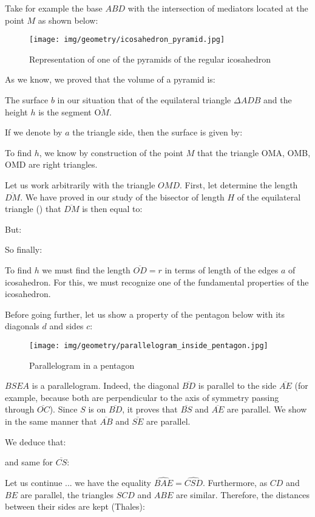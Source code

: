 {	Take for example the base $ABD$ with the intersection of mediators located at the point $M$ as shown below:
	\begin{figure}[H]
		\centering
		\texttt{[image: img/geometry/icosahedron\_pyramid.jpg]}
		\caption{Representation of one of the pyramids of the regular icosahedron}
	\end{figure}
	As we know, we proved that the volume of a pyramid is:
	
	The surface $b$ in our situation that of the equilateral triangle $\Delta ADB$ and the height $h$ is the segment $\overline{\text{O}M}$.

	If we denote by $a$ the triangle side, then the surface is given by:
	
	To find $h$, we know by construction of the point $M$ that the triangle OMA, OMB, OMD are right triangles.

	Let us work arbitrarily with the triangle $OMD$. First, let determine the length $\overline{DM}$. We have proved in our study of the bisector of length $H$ of the equilateral triangle () that $\overline{DM}$ is then equal to:
	
	But:
	
	So finally:
	
	To find $h$ we must find the length $\overline{OD}=r$ in terms of length of the edges $a$ of icosahedron. For this, we must recognize one of the fundamental properties of the icosahedron.

	Before going further, let us show a property of the pentagon below with its diagonals $d$ and sides $c$:
	\begin{figure}[H]
		\centering
		\texttt{[image: img/geometry/parallelogram\_inside\_pentagon.jpg]}
		\caption{Parallelogram in a pentagon}
	\end{figure}
	$BSEA$ is a parallelogram. Indeed, the diagonal $\overline{BD}$ is parallel to the side $\overline{AE}$ (for example, because both are perpendicular to the axis of symmetry passing through $\overline{OC}$). Since $S$ is on $\overline{BD}$, it proves that $\overline{BS}$ and $\overline{AE}$ are parallel. We show in the same manner that $\overline{AB}$ and $\overline{SE}$ are parallel.
	
	We deduce that:
	
	and same for $\overline{CS}$:
	
	Let us continue ... we have the equality $\widehat{BAE}=\widehat{CSD}$. Furthermore, as $CD$ and $BE$ are parallel, the triangles $SCD$ and $ABE$ are similar. Therefore, the distances between their sides are kept (Thales):
	
}
